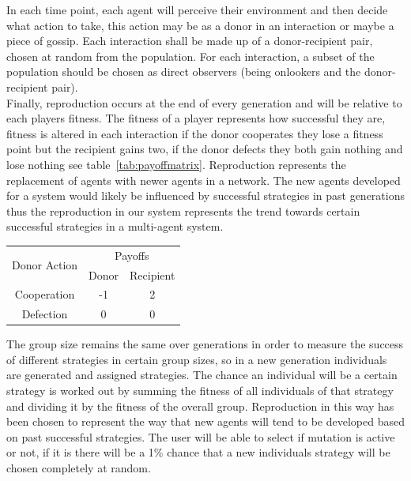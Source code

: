 \documentclass[twoside,twocolumn]{article}
\begin{document}
In each time point, each agent will perceive their environment and then decide what action to take, this action may be as a donor in an interaction or maybe a piece of gossip. Each interaction shall be made up of a donor-recipient pair, chosen at random from the population. For each interaction, a subset of the population should be chosen as direct observers (being onlookers and the donor-recipient pair).\\
Finally, reproduction occurs at the end of every generation and will be relative to each players fitness. The fitness of a player represents how successful they are, fitness is altered in each interaction if the donor cooperates they lose a fitness point but the recipient gains two, if the donor defects they both gain nothing and lose nothing see table~\ref{tab:payoffmatrix}. Reproduction represents the replacement of agents with newer agents in a network. The new agents developed for a system would likely be influenced by successful strategies in past generations thus the reproduction in our system represents the trend towards certain successful strategies in a multi-agent system.\\
\begin{framed}
	\begin{center}
		\begin{tabular}{c|c|c}
		\multirow{2}{*}{Donor Action} & \multicolumn{2}{c}{Payoffs}\\		
		& Donor & Recipient\\
		\hline
		Cooperation & -1 & 2\\
		\hline
		Defection & 0 & 0\\
		\end{tabular}
		\label{tab:payoffmatrix}
	\end{center}	
\end{framed}
The group size remains the same over generations in order to measure the success of different strategies in certain group sizes, so in a new generation individuals are generated and assigned strategies. The chance an individual will be a certain strategy is worked out by summing the fitness of all individuals of that strategy and dividing it by the fitness of the overall group. Reproduction in this way has been chosen to represent the way that new agents will tend to be developed based on past successful strategies. The user will be able to select if mutation is active or not, if it is there will be a 1\% chance that a new individuals strategy will be chosen completely at random.
\end{document}
